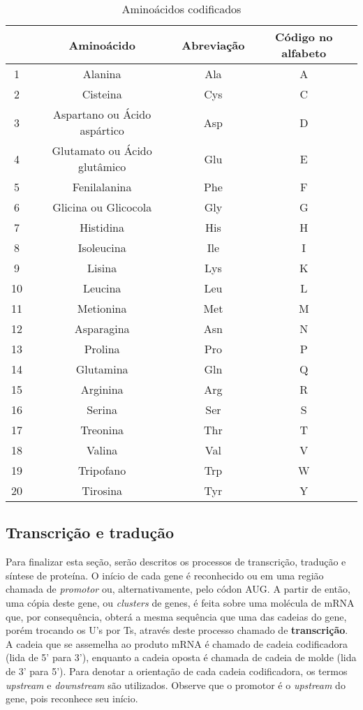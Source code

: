 \begin{table}[h!] 
\centering
\caption{Aminoácidos codificados} \label{tabelaAminoacidos}
\begin{tabular}{|c|c|c|c|} \hline
& Aminoácido & Abreviação & Código no alfabeto  \\  \hline
1 & Alanina & Ala & A \\ 
2 & Cisteina & Cys & C \\ 
3 & Aspartano ou Ácido aspártico & Asp & D \\ 
4 & Glutamato ou Ácido glutâmico & Glu & E \\ 
5 & Fenilalanina & Phe & F \\ 
6 & Glicina ou Glicocola & Gly & G \\ 
7 & Histidina & His & H \\ 
8 & Isoleucina & Ile & I \\ 
9 & Lisina & Lys & K \\ 
10 & Leucina & Leu & L \\ 
11 & Metionina & Met & M \\ 
12 & Asparagina & Asn & N \\ 
13 & Prolina & Pro & P \\ 
14 & Glutamina & Gln & Q \\ 
15 & Arginina & Arg & R \\ 
16 & Serina & Ser & S \\ 
17 & Treonina & Thr & T \\ 
18 & Valina & Val & V \\ 
19 & Tripofano & Trp & W \\ 
20 & Tirosina & Tyr & Y \\ \hline
 
\end{tabular}
\end{table}



\subsection{Transcrição e tradução} \label{sinteseDeProteina:transcricaoTraducaoSintese}

\indent Para finalizar esta seção, serão descritos os processos de transcrição, tradução e síntese de proteína. O início de cada gene é reconhecido ou em uma região chamada de \textit{promotor} ou, alternativamente, pelo códon AUG. A partir de então, uma cópia deste gene, ou \textit{clusters} de genes, é feita sobre uma molécula de mRNA que, por consequência, obterá a mesma sequência que uma das cadeias do gene, porém trocando os U's por Ts, através deste processo chamado de \textbf{transcrição}. A cadeia que se assemelha ao produto mRNA é chamado de cadeia codificadora (lida de 5' para 3'), enquanto a cadeia oposta é chamada de cadeia de molde (lida de 3' para 5'). Para denotar a orientação de cada cadeia codificadora, os termos \textit{upstream} e \textit{downstream} são utilizados. Observe que o promotor é o \textit{upstream} do gene, pois reconhece seu início. \\

